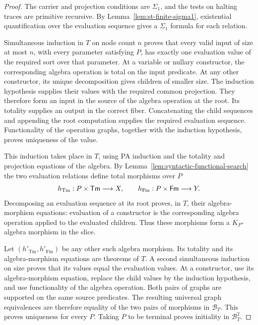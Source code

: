 \begin{proof}
The carrier and projection conditions are $\Sigma_1$, and the tests on
halting traces are primitive recursive. By Lemma~\ref{lem:st-finite-sigma1},
existential quantification over the evaluation sequence gives a $\Sigma_1$
formula for each relation.

Simultaneous induction in $T$ on node count $n$ proves that every
valid input of size at most $n$, with every parameter satisfying $P$,
has exactly one evaluation value of the required sort over that
parameter. At a variable or nullary constructor,
the corresponding algebra operation is total on the input
predicate. At any other constructor, its unique decomposition gives
children of smaller size. The induction hypothesis supplies their
values with the required common projection. They therefore form
an input in the source of the algebra operation at the root.
Its totality supplies an output in the correct fiber. Concatenating
the child sequences and appending the root computation supplies
the required evaluation sequence. Functionality of the operation graphs,
together with the induction hypothesis, proves uniqueness of the
value.

This induction takes place in $T$, using PA induction and the totality and
projection equations of the algebra. By Lemma~\ref{lem:syntactic-functional-search}
the two evaluation relations define total morphisms over $P$
\[
 h_{\mathrm{Tm}}:P\times\mathsf{Tm}\longrightarrow X,
 \qquad
 h_{\mathrm{Fm}}:P\times\mathsf{Fm}\longrightarrow Y.
\]
Decomposing an
evaluation sequence at its root proves, in $T$, their algebra-morphism
equations: evaluation of a constructor is the corresponding algebra
operation applied to the evaluated children. Thus these morphisms form
a $K_P$-algebra morphism in the slice.

Let $(h'_{\mathrm{Tm}},h'_{\mathrm{Fm}})$ be any other such algebra
morphism. Its totality and its algebra-morphism equations are
theorems of $T$. A second simultaneous induction on size proves
that its values equal the evaluation values. At a constructor,
use its algebra-morphism equation, replace the child values by the
induction hypothesis, and use functionality of the algebra
operation. Both pairs of graphs are supported on the same source
predicates. The resulting universal graph equivalences are
therefore equality of the two pairs of morphisms in
$\mathcal B_T$. This proves uniqueness for every $P$. Taking $P$
to be terminal proves initiality in $\mathcal B_T^2$.
\end{proof}

